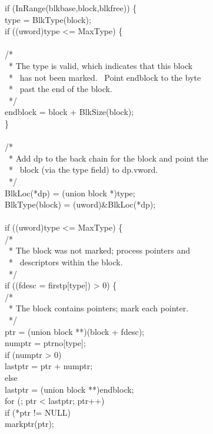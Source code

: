 {\>if (InRange(blkbase,block,blkfree)) \{\\
\>\>type = BlkType(block);\\
\>\>if ((uword)type <= MaxType) \{\\
\\
\>\>\>/*\\
\>\>\>\ * The type is valid, which indicates that this block\\
\>\>\>\ * \ has not been marked. \ Point endblock to the byte\\
\>\>\>\ * \ past the end of the block.\\
\>\>\>\ */\\
\>\>\>endblock = block + BlkSize(block);\\
\>\>\>\}\\
\\
\>\>/*\\
\>\>\ * Add dp to the back chain for the block and point the\\
\>\>\ * \ block (via the type field) to dp.vword.\\
\>\>\ */\\
\>\>BlkLoc(*dp) = (union block *)type;\\
\>\>BlkType(block) = (uword)\&BlkLoc(*dp);\\
\\
\>\>if ((uword)type <= MaxType) \{\\
\>\>\>/*\\
\>\>\>\ * The block was not marked; process pointers and\\
\>\>\>\ * \ descriptors within the block.\\
\>\>\>\ */\\
\>\>\>if ((fdesc = firstp[type]) > 0) \{\\
\>\>\>\>/*\\
\>\>\>\>\ * The block contains pointers; mark each pointer.\\
\>\>\>\>\ */\\
\>\>\>\>ptr = (union block **)(block + fdesc);\\
\>\>\>\>numptr = ptrno[type];\\
\>\>\>\>if (numptr > 0)\\
\>\>\>\>\>lastptr = ptr + numptr;\\
\>\>\>\>else\\
\>\>\>\>\>lastptr = (union block **)endblock;\\
\>\>\>\>for (; ptr < lastptr; ptr++)\\
\>\>\>\>\>if (*ptr != NULL)\\
\>\>\>\>\>\>markptr(ptr);\\
}
